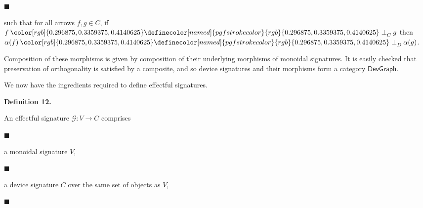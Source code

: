  
\par\noindent  $\blacksquare$ 
 
such that for all arrows $f,g\in C$, if $f\mathbin{{\color[rgb]{0.296875,0.3359375,0.4140625}\definecolor[named]{pgfstrokecolor}{rgb}{0.296875,0.3359375,0.4140625}\perp}_{C}}g$ then $\alpha(f)\mathbin{{\color[rgb]{0.296875,0.3359375,0.4140625}\definecolor[named]{pgfstrokecolor}{rgb}{0.296875,0.3359375,0.4140625}\perp}_{D}}\alpha(g)$.\par
 
 
  
 
 
 
Composition of these morphisms is given by composition of their underlying morphisms of monoidal signatures. It is easily checked that preservation of orthogonality is satisfied by a composite, and so device signatures and their morphisms form a category $\mathsf{DevGraph}$.\par
 
 
 
We now have the ingredients required to define effectful signatures.\par
 
 
 
\par\medskip\noindent\textbf{Definition 12.}\par
 
 
An effectful signature $\mathcal{G}:V\to C$ comprises\par
  
\par\noindent  $\blacksquare$ 
 
a monoidal signature $V$,\par
 
 
 
\par\noindent  $\blacksquare$ 
 
a device signature $C$ over the same set of objects as $V$,\par
 
 
 
\par\noindent  $\blacksquare$ 
 
